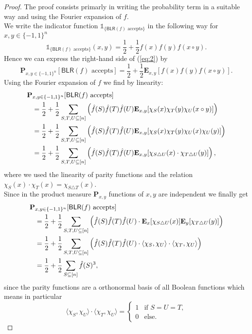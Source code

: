 \documentclass[a4paper]{article}
\newcommand{\prob}{\mathbf{P}}
\newcommand{\expe}{\mathbf{E}}
\newcommand{\nset}{[n]}
\theoremstyle{plain}
\theoremstyle{definition}
\theoremstyle{remark}
\begin{document}
\begin{proof}
  The proof consists primarly in writing the probability term in a
  suitable way and using the Fourier expansion of \(f\). \\
  We write the indicator function \(\mathbb{1}_{\{\textsf{BLR}(f) \text{ accepts}\}}\) in the
  following way for \(x,y \in \{-1,1\}^n\)
  \[\mathbb{1}_{\{\textsf{BLR}(f) \text{ accepts}\}}(x,y) =
  \frac{1}{2} + \frac{1}{2}f(x)f(y)f(x\circ y).\]
  Hence we can express the right-hand side of (\ref{eq:2}) by
  \[\prob_{x,y \in \{-1,1\}^n}[\textsf{BLR}(f) \text{ accepts}] =
  \frac{1}{2} + \frac{1}{2}\expe_{x,y}[f(x)f(y)f(x\circ y)].\]
  Using the Fourier expansion of \(f\) we find by linearity: 
  \begin{align}
    \label{eq:3}
    \prob&_{x,y \in \{-1,1\}^n}[\textsf{BLR}(f) \text{ accepts}] \notag \\ 
    &=  \frac{1}{2} + \frac{1}{2} \sum_{S,T,U \subseteq \nset}\left(\hat{f}(S) \hat{f}(T) \hat{f}(U) \expe_{x,y}[\chi_S(x)\chi_T(y)\chi_U(x\circ y)]\right) \\
    &= \frac{1}{2} + \frac{1}{2} \sum_{S,T,U \subseteq \nset}\left(\hat{f}(S) \hat{f}(T) \hat{f}(U) \expe_{x,y}[\chi_S(x) \chi_T(y) \chi_U(x) \chi_U(y)]\right) \\
    &= \frac{1}{2} + \frac{1}{2} \sum_{S,T,U \subseteq \nset}\left(\hat{f}(S) \hat{f}(T) \hat{f}(U) \expe_{x,y}[\chi_{S\triangle U}(x) \cdot \chi_{T \triangle U}(y)]\right),
  \end{align}
  where we used the linearity of parity functions and the relation
  \(\chi_S(x) \cdot \chi_T(x) = \chi_{S\triangle T}(x)\).\\
  Since in the product measure \(\prob_{x,y}\) functions of \(x,y\)
  are independent we finally get 
  \begin{align}
    \label{eq:4}
    \prob&_{x,y \in \{-1,1\}^n}[\textsf{BLR}(f) \text{ accepts}] \notag \\ 
    &= \frac{1}{2} + \frac{1}{2} \sum_{S,T,U \subseteq \nset}\left(\hat{f}(S) \hat{f}(T) \hat{f}(U) \cdot \expe_x[\chi_{S\triangle U}(x)] \expe_y[\chi_{T \triangle U}(y)]\right) \\
    &= \frac{1}{2} + \frac{1}{2} \sum_{S,T,U \subseteq \nset}\left(\hat{f}(S) \hat{f}(T) \hat{f}(U) \cdot \langle \chi_S, \chi_U \rangle \cdot \langle \chi_T, \chi_U \rangle \right) \\
    &= \frac{1}{2} + \frac{1}{2} \sum_{S \subseteq \nset} \hat{f}(S)^3, 
  \end{align}
  since the parity functions are a orthonormal basis of all Boolean
  functions which means in particular
  \[\langle \chi_S, \chi_U \rangle \cdot \langle \chi_T, \chi_U \rangle = 
  \begin{cases}
    1 & \text{if } S = U = T, \\
    0 & \text{else}.
  \end{cases}
\]
\end{proof}
\end{document}
